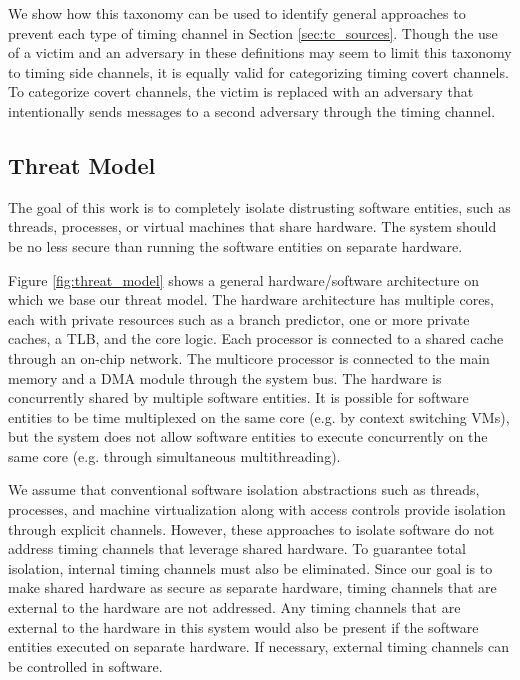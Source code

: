 We show how this taxonomy can be used to identify general approaches to prevent 
each type of timing channel in Section \ref{sec:tc_sources}. Though the use of 
a victim and an adversary in these definitions may seem to limit this taxonomy 
to timing side channels, it is equally valid for categorizing timing covert 
channels. To categorize covert channels, the victim is replaced with an 
adversary that intentionally sends messages to a second adversary through the 
timing channel.

\subsection{Threat Model}
The goal of this work is to completely isolate distrusting software entities, 
such as threads, processes, or virtual machines that share hardware. The system 
should be no less secure than running the software entities on separate 
hardware. 

Figure \ref{fig:threat_model} shows a general hardware/software architecture on 
which we base our threat model. The hardware architecture has multiple cores, 
each with private resources such as a branch predictor, one or more private 
caches, a TLB, and the core logic. Each processor is connected to a shared 
cache through an on-chip network. The multicore processor is connected to the 
main memory and a DMA module through the system bus. The hardware is 
concurrently shared by multiple software entities. It is possible for software 
entities to be time multiplexed on the same core (e.g.  by context switching 
VMs), but the system does not allow software entities to execute concurrently 
on the same core (e.g. through simultaneous multithreading). 

We assume that conventional software isolation abstractions such as threads, 
processes, and machine virtualization along with access controls provide 
isolation through explicit channels. However, these approaches to isolate 
software do not address timing channels that leverage shared hardware. To 
guarantee total isolation, internal timing channels must also be eliminated.  
Since our goal is to make shared hardware as secure as separate hardware, 
timing channels that are external to the hardware are not addressed. Any timing 
channels that are external to the hardware in this system would also be present 
if the software entities executed on separate hardware. If necessary, external 
timing channels can be controlled in software.

